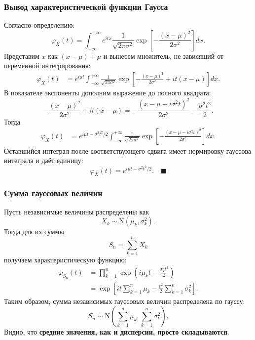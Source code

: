 \documentclass[
  russian,
  12pt,
  a4paper,
  a4paper,
  openany]{scrbook}
\begin{document}
\begin{bookderivation}

\subsubsection{Вывод характеристической функции
Гаусса}\label{ux432ux44bux432ux43eux434-ux445ux430ux440ux430ux43aux442ux435ux440ux438ux441ux442ux438ux447ux435ux441ux43aux43eux439-ux444ux443ux43dux43aux446ux438ux438-ux433ux430ux443ux441ux441ux430}

Согласно определению: \[\varphi_X(t)
=
\int_{-\infty}^{+\infty}
e^{itx}
\frac{1}{\sqrt{2\pi\sigma^2}}
\exp\!\left[-\frac{(x-\mu)^2}{2\sigma^2}\right]dx.\] Представим \(x\)
как \((x-\mu)+\mu\) и вынесем множитель, не зависящий от переменной
интегрирования: \[\begin{aligned}
\varphi_X(t)
&=
e^{i\mu t}
\int_{-\infty}^{+\infty}
\frac{1}{\sqrt{2\pi\sigma^2}}
\exp\!\left[
-\frac{(x-\mu)^2}{2\sigma^2}
+it(x-\mu)
\right]dx.
\end{aligned}\] В показателе экспоненты дополним выражение до полного
квадрата: \[-\frac{(x-\mu)^2}{2\sigma^2}
+it(x-\mu)
=
-\frac{(x-\mu-i\sigma^2t)^2}{2\sigma^2}
-\frac{\sigma^2t^2}{2}.\] Тогда \[\begin{aligned}
\varphi_X(t)
&=
e^{i\mu t-\sigma^2t^2/2}
\int_{-\infty}^{+\infty}
\frac{1}{\sqrt{2\pi\sigma^2}}
\exp\!\left[
-\frac{(x-\mu-i\sigma^2t)^2}{2\sigma^2}
\right]dx.
\end{aligned}\] Оставшийся интеграл после соответствующего сдвига имеет
нормировку гауссова интеграла и даёт единицу: \[\boxed{
\varphi_X(t)
=
e^{i\mu t-\sigma^2t^2/2}.
} \quad \blacksquare\]

\end{bookderivation}

\subsubsection{Сумма гауссовых
величин}\label{ux441ux443ux43cux43cux430-ux433ux430ux443ux441ux441ux43eux432ux44bux445-ux432ux435ux43bux438ux447ux438ux43d}

Пусть независимые величины распределены как
\[X_k\sim\mathrm{N}(\mu_k,\sigma_k^2).\] Тогда для их суммы
\[S_n=\sum_{k=1}^{n}X_k\] получаем характеристическую функцию:
\[\begin{aligned}
\varphi_{S_n}(t)
&=
\prod_{k=1}^{n}
\exp\!\left(
i\mu_k t-\frac{\sigma_k^2t^2}{2}
\right) \\
&=
\exp\!\left[
i t\sum_{k=1}^{n}\mu_k
-
\frac{t^2}{2}\sum_{k=1}^{n}\sigma_k^2
\right].
\end{aligned}\] Таким образом, сумма независимых гауссовых величин
распределена по гауссу: \[\boxed{
S_n
\sim
\mathrm{N}\!\left(
\sum_{k=1}^{n}\mu_k,
\sum_{k=1}^{n}\sigma_k^2
\right).
}\] Видно, что \textbf{средние значения, как и дисперсии, просто
складываются}.
\end{document}
